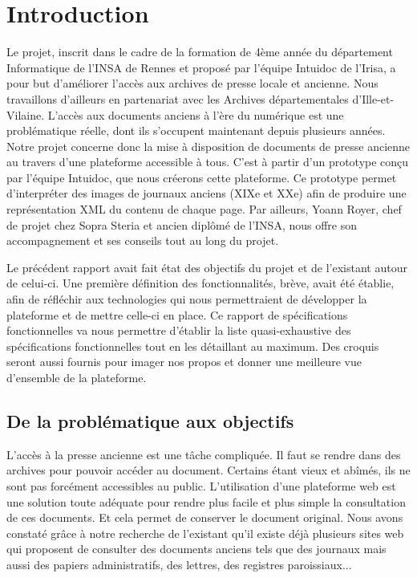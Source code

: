 \section{Introduction}
\label{sec:intro}

Le projet, inscrit dans le cadre de la formation de 4ème année du département Informatique de l’INSA de Rennes et proposé par l’équipe Intuidoc de l’Irisa, a pour but d’améliorer l’accès aux archives de presse locale et ancienne. Nous travaillons d'ailleurs en partenariat avec les Archives départementales d'Ille-et-Vilaine. L'accès aux documents anciens à l'ère du numérique est une problématique réelle, dont ils s'occupent maintenant depuis plusieurs années. Notre projet concerne donc la mise à disposition de documents de presse ancienne au travers d'une plateforme accessible à tous. C'est à partir d'un prototype conçu par l'équipe Intuidoc, que nous créerons cette plateforme. Ce prototype permet d'interpréter des images de journaux anciens (XIXe et XXe) afin de produire une représentation XML du contenu de chaque page. Par ailleurs, Yoann Royer, chef de projet chez Sopra Steria et ancien diplômé de l'INSA, nous offre son accompagnement et ses conseils tout au long du projet.

Le précédent rapport avait fait état des objectifs du projet et de l'existant autour de celui-ci. Une première définition des fonctionnalités, brève, avait été établie, afin de réfléchir aux technologies qui nous permettraient de développer la plateforme et de mettre celle-ci en place. Ce rapport de spécifications fonctionnelles va nous permettre d'établir la liste quasi-exhaustive des spécifications fonctionnelles tout en les détaillant au maximum. Des croquis seront aussi fournis pour imager nos propos et donner une meilleure vue d'ensemble de la plateforme.

    \subsection{De la problématique aux objectifs}
		\label{sec:probleme}
		
		L'accès à la presse ancienne est une tâche compliquée. Il faut se rendre dans des archives pour pouvoir accéder au document. Certains étant vieux et abîmés, ils ne sont pas forcément accessibles au public. L'utilisation d'une plateforme web est une solution toute adéquate pour rendre plus facile et plus simple la consultation de ces documents. Et cela permet de conserver le document original. Nous avons constaté grâce à notre recherche de l'existant qu'il existe déjà plusieurs sites web qui proposent de consulter des documents anciens tels que des journaux mais aussi des papiers administratifs, des lettres, des registres paroissiaux... 
		
